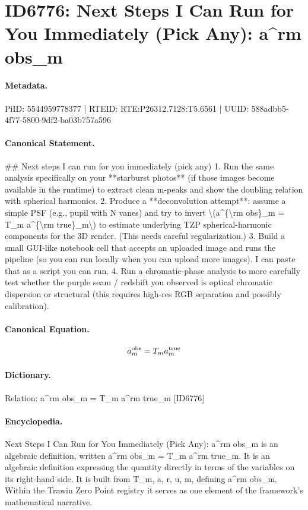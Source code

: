 \section*{ID6776: Next Steps I Can Run for You Immediately (Pick Any): a\textasciicircum{}rm obs\_m}
\paragraph{Metadata.}
PiID: 5544959778377 | RTEID: RTE:P26312.7128:T5.6561 | UUID: 588adbb5-4f77-5800-9df2-ba03b757a596

\paragraph{Canonical Statement.}
\#\# Next steps I can run for you immediately (pick any) 1. Run the same analysis specifically on your **starburst photos** (if those images become available in the runtime) to extract clean m-peaks and show the doubling relation with spherical harmonics. 2. Produce a **deconvolution attempt**: assume a simple PSF (e.g., pupil with N vanes) and try to invert \textbackslash{}(a\textasciicircum{}\{\textbackslash{}rm obs\}\_m = T\_m a\textasciicircum{}\{\textbackslash{}rm true\}\_m\textbackslash{}) to estimate underlying TZP spherical-harmonic components for the 3D render. (This needs careful regularization.) 3. Build a small GUI-like notebook cell that accepts an uploaded image and runs the pipeline (so you can run locally when you can upload more images). I can paste that as a script you can run. 4. Run a chromatic-phase analysis to more carefully test whether the purple seam / redshift you observed is optical chromatic dispersion or structural (this requires high-res RGB separation and possibly calibration).

\paragraph{Canonical Equation.}
\[
a^{\rm obs}_m = T_m a^{\rm true}_m
\]

\paragraph{Dictionary.}
Relation: a\textasciicircum{}rm obs\_m = T\_m a\textasciicircum{}rm true\_m [ID6776]

\paragraph{Encyclopedia.}
Next Steps I Can Run for You Immediately (Pick Any): a\textasciicircum{}rm obs\_m is an algebraic definition, written a\textasciicircum{}rm obs\_m = T\_m a\textasciicircum{}rm true\_m. It is an algebraic definition expressing the quantity directly in terms of the variables on its right-hand side. It is built from T\_m, a, r, u, m, defining a\textasciicircum{}rm obs\_m. Within the Trawin Zero Point registry it serves as one element of the framework's mathematical narrative.

